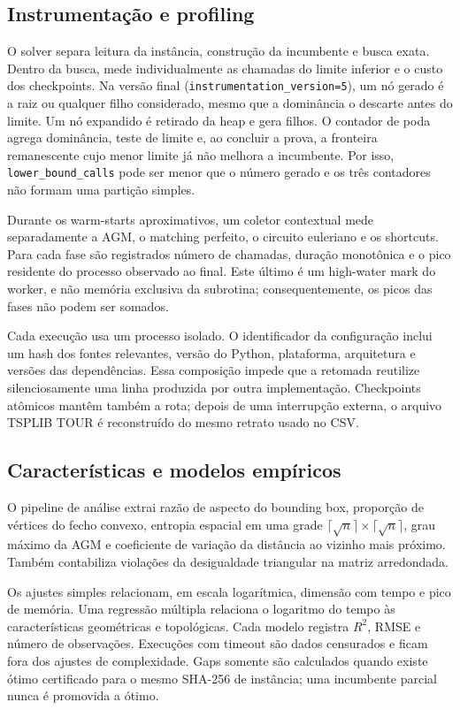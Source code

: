 \documentclass[12pt]{article}
\begin{document}
\subsection{Instrumentação e profiling}

O solver separa leitura da instância, construção da incumbente e busca exata.
Dentro da busca, mede individualmente as chamadas do limite inferior e o custo
dos checkpoints. Na versão final (\texttt{instrumentation\_version=5}), um nó
gerado é a raiz ou qualquer filho considerado, mesmo que a dominância o descarte
antes do limite. Um nó expandido
é retirado da heap e gera filhos. O contador de poda agrega dominância, teste de
limite e, ao concluir a prova, a fronteira remanescente cujo menor limite já não
melhora a incumbente. Por isso, \texttt{lower\_bound\_calls} pode ser menor que
o número gerado e os três contadores não formam uma partição simples.

Durante os warm-starts aproximativos, um coletor contextual mede separadamente
a AGM, o matching perfeito, o circuito euleriano e os shortcuts. Para cada
fase são registrados número de chamadas, duração monotônica e o pico residente
do processo observado ao final. Este último é um high-water mark do worker, e
não memória exclusiva da subrotina; consequentemente, os picos das fases não
podem ser somados.

Cada execução usa um processo isolado. O identificador da configuração inclui
um hash dos fontes relevantes, versão do Python, plataforma, arquitetura e
versões das dependências. Essa composição impede que a retomada reutilize
silenciosamente uma linha produzida por outra implementação. Checkpoints
atômicos mantêm também a rota; depois de uma interrupção externa, o arquivo
TSPLIB TOUR é reconstruído do mesmo retrato usado no CSV.

\subsection{Características e modelos empíricos}

O pipeline de análise extrai razão de aspecto do bounding box, proporção de
vértices do fecho convexo, entropia espacial em uma grade
$\lceil\sqrt{n}\rceil\times\lceil\sqrt{n}\rceil$, grau máximo da AGM e
coeficiente de variação da distância ao vizinho mais próximo. Também contabiliza
violações da desigualdade triangular na matriz arredondada.

Os ajustes simples relacionam, em escala logarítmica, dimensão com tempo e pico
de memória. Uma regressão múltipla relaciona o logaritmo do tempo às
características geométricas e topológicas. Cada modelo registra $R^2$, RMSE e
número de observações. Execuções com timeout são dados censurados e ficam fora
dos ajustes de complexidade. Gaps somente são calculados quando existe ótimo
certificado para o mesmo SHA-256 de instância; uma incumbente parcial nunca é
promovida a ótimo.
\end{document}
